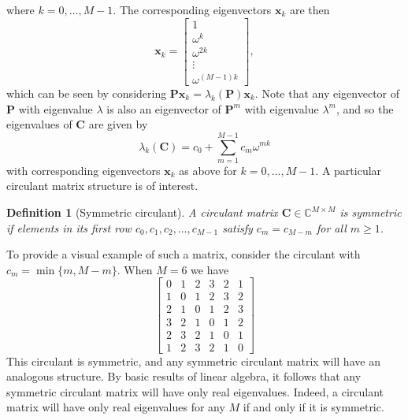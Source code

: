 \documentclass[letterpaper,12pt,oneside,final]{article}
\newtheorem{definition}{Definition}
\newcommand{\ve}[1]{\mathbf{#1}}           %
\newcommand{\m}[1]{\mathbf{#1}}               %
\newcommand{\field}[1]{\mathbb{#1}}
\newcommand{\Complex}{\field{C}}
\begin{document}
where $k = 0, \dots, M-1$. The corresponding eigenvectors $\ve{x}_k$ are then
\begin{equation} \label{eq:multipleTesting:circEigenVec}
  \ve{x}_k = \begin{bmatrix}
  1 \\
  \omega^k \\
  \omega^{2k} \\
  \vdots \\
  \omega^{(M-1)k}
\end{bmatrix},
\end{equation}
which can be seen by considering $\m{P} \ve{x}_k = \lambda_k(\m{P}) \ve{x}_k$. Note that any eigenvector of $\m{P}$ with eigenvalue $\lambda$ is also an eigenvector of $\m{P}^m$ with eigenvalue $\lambda^m$, and so the eigenvalues of $\m{C}$ are given by
\begin{equation} \label{eq:multipleTesting:circEigenVals}
  \lambda_k (\m{C}) = c_0 + \sum_{m = 1}^{M-1} c_m \omega^{mk}
\end{equation}
with corresponding eigenvectors $\ve{x}_k$ as above for $k = 0, \dots, M-1$. A particular circulant matrix structure is of interest.

\begin{definition}[Symmetric circulant] \label{def:symmCirc}
  A circulant matrix $\m{C} \in \Complex^{M \times M}$ is symmetric if elements in its first row $c_0, c_1, c_2, \dots, c_{M-1}$ satisfy $c_m = c_{M-m}$ for all $m \geq 1$.
\end{definition}

To provide a visual example of such a matrix, consider the circulant with $c_m = \min \{m, M-m\}$. When $M = 6$ we have
$$\begin{bmatrix}
  0 & 1 & 2 & 3 & 2 & 1 \\
  1 & 0 & 1 & 2 & 3 & 2 \\
  2 & 1 & 0 & 1 & 2 & 3 \\
  3 & 2 & 1 & 0 & 1 & 2 \\
  2 & 3 & 2 & 1 & 0 & 1 \\
  1 & 2 & 3 & 2 & 1 & 0
\end{bmatrix}$$
This circulant is symmetric, and any symmetric circulant matrix will have an analogous structure. By basic results of linear algebra, it follows that any symmetric circulant matrix will have only real eigenvalues. Indeed, a circulant matrix will have only real eigenvalues for any $M$ if and only if it is symmetric.
\end{document}
